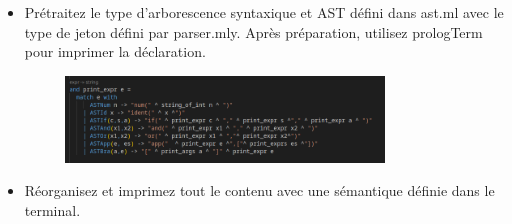 \documentclass{article}
\begin{document}
\begin{itemize}
		\item Prétraitez le type d'arborescence syntaxique et AST défini dans ast.ml avec le type de jeton défini par parser.mly. Après préparation, utilisez prologTerm pour imprimer la déclaration.
		
		\begin{figure}[H]
			\centering
			\includegraphics[width=0.8\textwidth]{./images/prologTerm.png}
			\label{fig:exemple1}
		\end{figure}
	
		\item Réorganisez et imprimez tout le contenu avec une sémantique définie dans le terminal.
		

\end{itemize}
\end{document}
